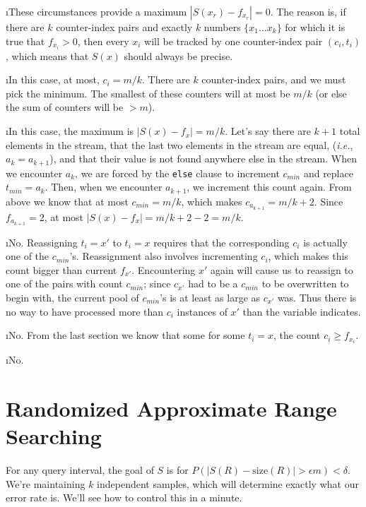 \documentclass[fleqn]{article}
\begin{document}
\i These circumstances provide a maximum $|S(x_r) - f_{x_r}| = 0$. The reason is, if there are $k$ counter-index pairs and exactly $k$ numbers $\{x_1 \ldots x_k\}$ for which it is true that $f_{x_i} > 0$, then every $x_i$ will be tracked by one counter-index pair $(c_i, t_i)$, which means that $S(x)$ should always be precise.

\i In this case, at most, $c_i = m/k$. There are $k$ counter-index pairs, and we must pick the minimum. The smallest of these counters will at most be $m/k$ (or else the sum of counters will be $> m$).

\i In this case, the maximum is $|S(x) - f_x| = m/k$. Let's say there are $k + 1$ total elements in the stream, that the last two elements in the stream are equal, (\textit{i.e.}, $a_k = a_{k+1}$), and that their value is not found anywhere else in the stream. When we encounter $a_k$, we are forced by the \texttt{else} clause to increment $c_{min}$ and replace $t_{min} = a_k$. Then, when we encounter $a_{k+1}$, we increment this count again. From above we know that at most $c_{min} = m/k$, which makes $c_{a_{k+1}} = m/k + 2$. Since $f_{a_{k+1}} = 2$, at most $|S(x) - f_x| = m/k + 2 - 2 = m/k$.

\i No. Reassigning $t_i = x'$ to $t_i = x$ requires that the corresponding $c_i$ is actually one of the $c_{min}$'s. Reassignment also involves incrementing $c_i$, which makes this count bigger than current $f_{x'}$. Encountering $x'$ again will cause us to reassign to one of the pairs with count $c_{min}$; since $c_{x'}$ had to be a $c_{min}$ to be overwritten to begin with, the current pool of $c_{min}$'s is at least as large as $c_{x'}$ was. Thus there is no way to have processed more than $c_i$ instances of $x'$ than the variable indicates.

\i No. From the last section we know that some for some $t_i = x$, the count $c_i \ge f_{x_i}$.

\i No.

\ene


\section{Randomized Approximate Range Searching}

For any query interval, the goal of $S$ is for $P(|S(R) - \mbox{size}(R)| > \epsilon m) < \delta$. We're maintaining $k$ independent samples, which will determine exactly what our error rate is. We'll see how to control this in a minute.
\end{document}
